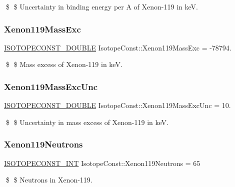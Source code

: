 \$ \$ Uncertainty in binding energy per A of Xenon-\/119 in keV. \mbox{\label{group___isotope_const-_xenon-_xe119_gacc5667a31a1e7951483e651005e7709e}} 
\subsubsection{\texorpdfstring{Xenon119\+Mass\+Exc}{Xenon119MassExc}}
{\footnotesize\ttfamily \mbox{\hyperlink{group___isotope_const-_macros_ga8f45a7272ce02c0b4c65c44636ed719a}{I\+S\+O\+T\+O\+P\+E\+C\+O\+N\+S\+T\+\_\+\+D\+O\+U\+B\+LE}} Isotope\+Const\+::\+Xenon119\+Mass\+Exc = -\/78794.}

\$ \$ Mass excess of Xenon-\/119 in keV. \mbox{\label{group___isotope_const-_xenon-_xe119_gab48040396598ed40fe05714ee589eba5}} 
\subsubsection{\texorpdfstring{Xenon119\+Mass\+Exc\+Unc}{Xenon119MassExcUnc}}
{\footnotesize\ttfamily \mbox{\hyperlink{group___isotope_const-_macros_ga8f45a7272ce02c0b4c65c44636ed719a}{I\+S\+O\+T\+O\+P\+E\+C\+O\+N\+S\+T\+\_\+\+D\+O\+U\+B\+LE}} Isotope\+Const\+::\+Xenon119\+Mass\+Exc\+Unc = 10.}

\$ \$ Uncertainty in mass excess of Xenon-\/119 in keV. \mbox{\label{group___isotope_const-_xenon-_xe119_ga8c92c8542808436c2ba3852360b1e61d}} 
\subsubsection{\texorpdfstring{Xenon119\+Neutrons}{Xenon119Neutrons}}
{\footnotesize\ttfamily \mbox{\hyperlink{group___isotope_const-_macros_ga5f18360b3e99483a35c32d789e62621c}{I\+S\+O\+T\+O\+P\+E\+C\+O\+N\+S\+T\+\_\+\+I\+NT}} Isotope\+Const\+::\+Xenon119\+Neutrons = 65}

\$ \$ Neutrons in Xenon-\/119. \mbox{\label{group___isotope_const-_xenon-_xe119_ga97e50e75c9fae9973cfc34ae9ddd1ba9}} 
